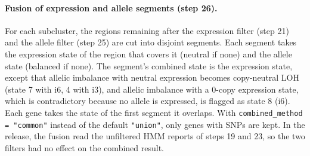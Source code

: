 \paragraph{Fusion of expression and allele segments (step 26).}
For each subcluster, the regions remaining after the expression filter (step 21) and the allele filter (step 25) are cut into disjoint segments. Each segment takes the expression state of the region that covers it (neutral if none) and the allele state (balanced if none). The segment's combined state is the expression state, except that allelic imbalance with neutral expression becomes copy-neutral LOH (state 7 with i6, 4 with i3), and allelic imbalance with a 0-copy expression state, which is contradictory because no allele is expressed, is flagged as state 8 (i6). Each gene takes the state of the first segment it overlaps. With \texttt{combined\_method = "common"} instead of the default \texttt{"union"}, only genes with SNPs are kept. In the release, the fusion read the unfiltered HMM reports of steps 19 and 23, so the two filters had no effect on the combined result.

